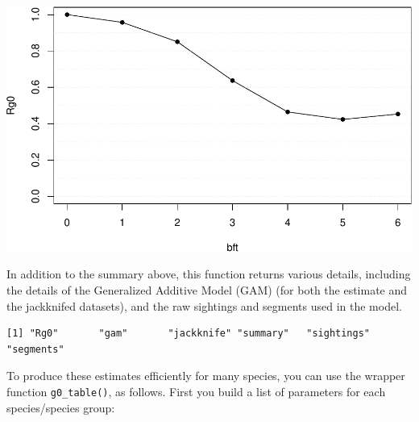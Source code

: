 \documentclass[
]{book}
\begin{document}
\includegraphics{figures/unnamed-chunk-202-1.pdf}

In addition to the summary above, this function returns various details, including the details of the Generalized Additive Model (GAM) (for both the estimate and the jackknifed datasets), and the raw sightings and segments used in the model.

\begin{verbatim}
[1] "Rg0"       "gam"       "jackknife" "summary"   "sightings" "segments" 
\end{verbatim}

To produce these estimates efficiently for many species, you can use the wrapper function \texttt{g0\_table()}, as follows. First you build a list of parameters for each species/species group:
\end{document}
